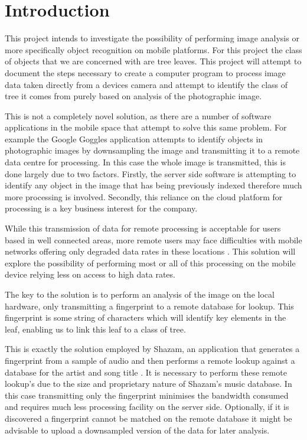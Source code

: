 \chapter{Introduction}

This project intends to investigate the possibility of performing image analysis or more specifically object recognition on mobile platforms. For this project the class of objects that we are concerned with are tree leaves. This project will attempt to document the steps necessary to create a computer program to process image data taken directly from a devices camera and attempt to identify the class of tree it comes from purely based on analysis of the photographic image.

This is not a completely novel solution, as there are a number of software applications in the mobile space that attempt to solve this same problem. For example the Google Goggles\textsuperscript{\texttrademark} application attempts to identify objects in photographic images by downsampling the image and transmitting it to a remote data centre for processing. In this case the whole image is transmitted, this is done largely due to two factors. Firstly, the server side software is attempting to identify any object in the image that has being previously indexed therefore much more processing is involved. Secondly, this reliance on the cloud platform for processing is a key business interest for the company.

While this transmission of data for remote processing is acceptable for users based in well connected areas, more remote users may face difficulties with mobile networks offering only degraded data rates in these locations \cite{iia08}. This solution will explore the possibility of performing most or all of this processing on the mobile device relying less on access to high data rates.

The key to the solution is to perform an analysis of the image on the local hardware, only transmitting a fingerprint to a remote database for lookup. This fingerprint is some string of characters which will identify key elements in the leaf, enabling us to link this leaf to a class of tree.

This is exactly the solution employed by Shazam, an application that generates a fingerprint from a sample of audio and then performs a remote lookup against a database for the artist and song title \cite{wang03}. It is necessary to perform these remote lookup’s due to the size and proprietary nature of Shazam’s music database. In this case transmitting only the fingerprint minimises the bandwidth consumed and requires much less processing facility on the server side. Optionally, if it is discovered a fingerprint cannot be matched on the remote database it might be advisable to upload a downsampled version of the data for later analysis.

